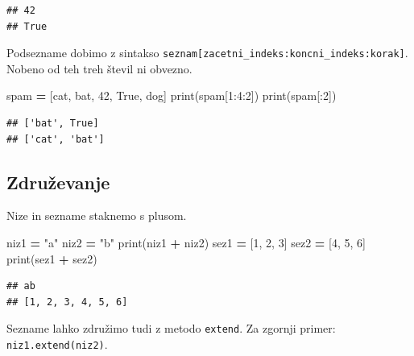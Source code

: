 \documentclass[
]{book}
\newenvironment{Shaded}{\begin{snugshade}}{\end{snugshade}}
\newcommand{\BuiltInTok}[1]{#1}
\newcommand{\DecValTok}[1]{\textcolor[rgb]{0.00,0.00,0.81}{#1}}
\newcommand{\NormalTok}[1]{#1}
\newcommand{\OperatorTok}[1]{\textcolor[rgb]{0.81,0.36,0.00}{\textbf{#1}}}
\newcommand{\StringTok}[1]{\textcolor[rgb]{0.31,0.60,0.02}{#1}}
\newcommand{\VariableTok}[1]{\textcolor[rgb]{0.00,0.00,0.00}{#1}}
\begin{document}
\begin{verbatim}
## 42
## True
\end{verbatim}

Podsezname dobimo z sintakso \texttt{seznam{[}zacetni\_indeks:koncni\_indeks:korak{]}}. Nobeno
od teh treh števil ni obvezno.

\begin{Shaded}
\begin{Highlighting}[]
\NormalTok{spam }\OperatorTok{=}\NormalTok{ [}\StringTok{\textquotesingle{}cat\textquotesingle{}}\NormalTok{, }\StringTok{\textquotesingle{}bat\textquotesingle{}}\NormalTok{, }\DecValTok{42}\NormalTok{, }\VariableTok{True}\NormalTok{, }\StringTok{\textquotesingle{}dog\textquotesingle{}}\NormalTok{]}
\BuiltInTok{print}\NormalTok{(spam[}\DecValTok{1}\NormalTok{:}\DecValTok{4}\NormalTok{:}\DecValTok{2}\NormalTok{])}
\BuiltInTok{print}\NormalTok{(spam[:}\DecValTok{2}\NormalTok{])}
\end{Highlighting}
\end{Shaded}

\begin{verbatim}
## ['bat', True]
## ['cat', 'bat']
\end{verbatim}

\hypertarget{zdruux17eevanje}{%
\subsection{Združevanje}\label{zdruux17eevanje}}

Nize in sezname staknemo s plusom.

\begin{Shaded}
\begin{Highlighting}[]
\NormalTok{niz1 }\OperatorTok{=} \StringTok{"a"}
\NormalTok{niz2 }\OperatorTok{=} \StringTok{"b"}
\BuiltInTok{print}\NormalTok{(niz1 }\OperatorTok{+}\NormalTok{ niz2)}
\NormalTok{sez1 }\OperatorTok{=}\NormalTok{ [}\DecValTok{1}\NormalTok{, }\DecValTok{2}\NormalTok{, }\DecValTok{3}\NormalTok{]}
\NormalTok{sez2 }\OperatorTok{=}\NormalTok{ [}\DecValTok{4}\NormalTok{, }\DecValTok{5}\NormalTok{, }\DecValTok{6}\NormalTok{]}
\BuiltInTok{print}\NormalTok{(sez1 }\OperatorTok{+}\NormalTok{ sez2)}
\end{Highlighting}
\end{Shaded}

\begin{verbatim}
## ab
## [1, 2, 3, 4, 5, 6]
\end{verbatim}

Sezname lahko združimo tudi z metodo \texttt{extend}. Za zgornji primer: \texttt{niz1.extend(niz2)}.
\end{document}
